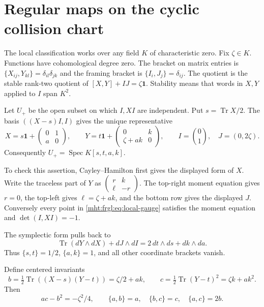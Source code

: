 \section{Regular maps on the cyclic collision chart}
\label{mht:frgl:sec:local-chart}

The local classification works over any field $K$ of characteristic zero.
Fix $\zeta\in K$. Functions have cohomological degree zero. The bracket
on matrix entries is $\{X_{ij},Y_{kl}\}=\delta_{il}\delta_{jk}$ and the
framing bracket is $\{I_i,J_j\}=\delta_{ij}$. The quotient is the stable
rank-two quotient of $[X,Y]+IJ=\zeta\mathbf1$. Stability means that words
in $X,Y$ applied to $I$ span $K^2$.

Let $U_+$ be the open subset on which $I,XI$ are independent. Put
$s=\operatorname{Tr}X/2$. The basis $((X-s)I,I)$ gives the unique representative
\begin{equation}\label{mht:frgl:eq:local-gauge}
 X=s\mathbf1+\begin{pmatrix}0&1\\a&0\end{pmatrix},\qquad
 Y=t\mathbf1+\begin{pmatrix}0&k\\\zeta+ak&0\end{pmatrix},\qquad
 I=\binom01,\quad J=(0,2\zeta).
\end{equation}
Consequently $U_+=\operatorname{Spec}K[s,t,a,k]$.

To check this assertion,
Cayley--Hamilton first gives the displayed form of $X$. Write the traceless
part of $Y$ as $\left(\begin{smallmatrix}r&k\\\ell&-r\end{smallmatrix}\right)$.
The top-right moment equation gives $r=0$, the top-left gives
$\ell=\zeta+ak$, and the bottom row gives the displayed $J$. Conversely
every point in \eqref{mht:frgl:eq:local-gauge} satisfies the moment equation and
$\det(I,XI)=-1$.

The symplectic form pulls back to
\[
 \operatorname{Tr}(dY\wedge dX)+dJ\wedge dI
   =2\,dt\wedge ds+dk\wedge da.
\]
Thus $\{s,t\}=1/2$, $\{a,k\}=1$, and all other coordinate brackets
vanish.

Define centered invariants
\[
 b=\tfrac12\operatorname{Tr}((X-s)(Y-t))=\zeta/2+ak,
 \qquad c=\tfrac12\operatorname{Tr}(Y-t)^2=\zeta k+ak^2.
\]
Then
\begin{equation}\label{mht:frgl:eq:orbit}
 ac-b^2=-\zeta^2/4,\qquad
 \{a,b\}=a,\quad\{b,c\}=c,\quad\{a,c\}=2b.
\end{equation}


